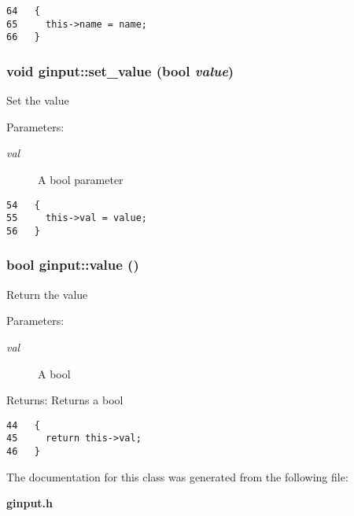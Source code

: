 \begin{Code}\begin{verbatim}64   {
65     this->name = name;
66   }
\end{verbatim}\end{Code}


\subsubsection{\setlength{\rightskip}{0pt plus 5cm}void ginput::set\_\-value (bool {\em value})\hspace{0.3cm}{\tt  [inline]}}\label{classginput_f3565a9358711dc45e20a6ce343081fb}


Set the value

\begin{Desc}
\item[Parameters:]
\begin{description}
\item[{\em val}]A bool parameter \end{description}
\end{Desc}


\begin{Code}\begin{verbatim}54   {
55     this->val = value;
56   }
\end{verbatim}\end{Code}


\subsubsection{\setlength{\rightskip}{0pt plus 5cm}bool ginput::value ()\hspace{0.3cm}{\tt  [inline]}}\label{classginput_50570f9660ec53425f39a6acb1fa9f6f}


Return the value

\begin{Desc}
\item[Parameters:]
\begin{description}
\item[{\em val}]A bool \end{description}
\end{Desc}
\begin{Desc}
\item[Returns:]Returns a bool \end{Desc}


\begin{Code}\begin{verbatim}44   {
45     return this->val;
46   }  
\end{verbatim}\end{Code}




The documentation for this class was generated from the following file:\begin{CompactItemize}
\item 
\bf{ginput.h}\end{CompactItemize}
